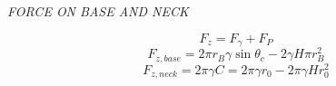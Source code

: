 \documentclass[a0,portrait,16pt]{a0poster}
\begin{document}
{{\vspace{0.75cm}
\begin{center}
	\textsf{\large{\textit{\textcolor[RGB]{77,134,66}{FORCE ON BASE AND NECK}}}}
\end{center}
\begin{equation}
F_{z} = F_{\gamma} + F_{P}
\end{equation}
\begin{equation}
F_{z,base} = 2\pi r_B\gamma\sin\theta_c - 2\gamma H\pi r^2_B
\end{equation}
\begin{equation}
F_{z,neck} = 2\pi\gamma C =2\pi\gamma r_0 - 2\pi\gamma H r_0^2
\end{equation}
 
}}
\end{document}
